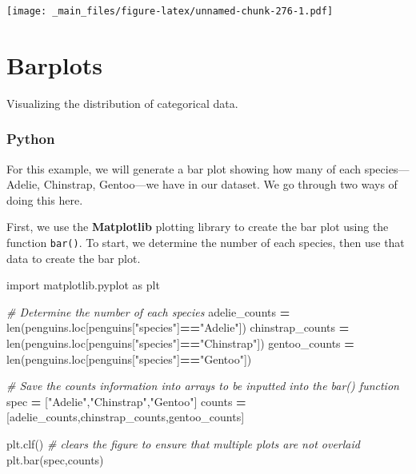 \documentclass[
]{book}
\newenvironment{Shaded}{\begin{snugshade}}{\end{snugshade}}
\newcommand{\BuiltInTok}[1]{#1}
\newcommand{\CommentTok}[1]{\textcolor[rgb]{0.56,0.35,0.01}{\textit{#1}}}
\newcommand{\ImportTok}[1]{#1}
\newcommand{\NormalTok}[1]{#1}
\newcommand{\OperatorTok}[1]{\textcolor[rgb]{0.81,0.36,0.00}{\textbf{#1}}}
\newcommand{\StringTok}[1]{\textcolor[rgb]{0.31,0.60,0.02}{#1}}
\begin{document}
\texttt{[image: \_main\_files/figure-latex/unnamed-chunk-276-1.pdf]}

\hypertarget{barplots}{%
\section{Barplots}\label{barplots}}

Visualizing the distribution of categorical data.

\hypertarget{python-42}{%
\subsubsection*{Python}\label{python-42}}

For this example, we will generate a bar plot showing how many of each species---Adelie, Chinstrap, Gentoo---we have in our dataset. We go through two ways of doing this here.

First, we use the \textbf{Matplotlib} plotting library to create the bar plot using the function \texttt{bar()}. To start, we determine the number of each species, then use that data to create the bar plot.

\begin{Shaded}
\begin{Highlighting}[]
\ImportTok{import}\NormalTok{ matplotlib.pyplot }\ImportTok{as}\NormalTok{ plt }

\CommentTok{\# Determine the number of each species}
\NormalTok{adelie\_counts }\OperatorTok{=} \BuiltInTok{len}\NormalTok{(penguins.loc[penguins[}\StringTok{"species"}\NormalTok{]}\OperatorTok{==}\StringTok{"Adelie"}\NormalTok{])}
\NormalTok{chinstrap\_counts }\OperatorTok{=} \BuiltInTok{len}\NormalTok{(penguins.loc[penguins[}\StringTok{"species"}\NormalTok{]}\OperatorTok{==}\StringTok{"Chinstrap"}\NormalTok{])}
\NormalTok{gentoo\_counts }\OperatorTok{=} \BuiltInTok{len}\NormalTok{(penguins.loc[penguins[}\StringTok{"species"}\NormalTok{]}\OperatorTok{==}\StringTok{"Gentoo"}\NormalTok{])}

\CommentTok{\# Save the counts information into arrays to be inputted into the bar() function}
\NormalTok{spec }\OperatorTok{=}\NormalTok{ [}\StringTok{"Adelie"}\NormalTok{,}\StringTok{"Chinstrap"}\NormalTok{,}\StringTok{"Gentoo"}\NormalTok{]}
\NormalTok{counts }\OperatorTok{=}\NormalTok{ [adelie\_counts,chinstrap\_counts,gentoo\_counts]}

\NormalTok{plt.clf() }\CommentTok{\# clears the figure to ensure that multiple plots are not overlaid}
\NormalTok{plt.bar(spec,counts)}
\end{Highlighting}
\end{Shaded}
\end{document}
